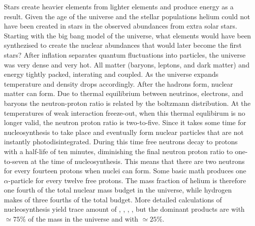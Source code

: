 Stars create heavier elements from lighter elements and produce energy as a result. Given the age of the universe and the stellar populations helium could not have been created in stars in the observed abundances from extra solar stars.
Starting with the big bang model of the universe, what elements would have been synthezised to create the nuclear abundances that would later become the first stars?
After inflation separates quantum fluctuations into particles, the universe was very dense and very hot. All matter (baryons, leptons, and dark matter) and energy tightly packed, interating and coupled. As the universe expands temperature and density drops accordingly.
After the hadrons form, nuclear matter can form.
Due to thermal equilibrium between neutrinos, electrons, and baryons the neutron-proton ratio is related by the boltzmann distribution. At the temperatures of weak interaction freeze-out, when this thermal equlibirum is no longer valid, the neutron proton ratio is two-to-five.
Since it takes some time for nucleosynthesis to take place and eventually form nuclear particles that are not instantly photodisintegrated.
During this time free neutrons decay to protons with a half-life of ten minutes, diminishing the final neutron proton ratio to one-to-seven at the time of nucleosynthesis. This means that there are two neutrons for every fourteen protons when nuclei can form.
Some basic math produces one $\alpha$-particle for every twelve free protons. The mass fraction of helium is therefore one fourth of the total nuclear mass budget in the universe, while hydrogen makes of three fourths of the total budget.
More detailed calculations of nucleosynthesis yield trace amount of , , , , but the dominant products are  with $\simeq75\%$ of the mass in the universe and  with $\simeq25\%$.

